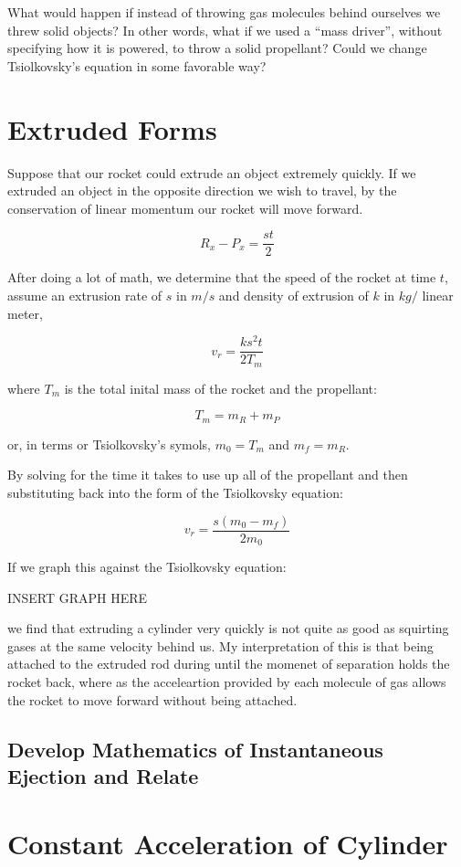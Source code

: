 \documentclass[11pt]{article}
\begin{document}
What would happen if instead of throwing gas molecules behind ourselves
we threw solid objects? In other words, what if we used a ``mass driver'',
without specifying how it is powered, to throw a solid propellant?
Could we change Tsiolkovsky's equation in some favorable way?

\section{Extruded Forms}

Suppose that our rocket could extrude an object extremely quickly.
If we extruded an object in the opposite direction we wish to travel,
by the conservation of linear momentum our rocket will move forward.

\[
\tag{Linear Extrusion} R_x - P_x  = \frac{s t}{2}
\]


After doing a lot of math, we determine that the speed of the rocket
at time $t$, assume an extrusion rate of $s$ in $m /s$ and density
of extrusion of $k$ in $kg / $ linear meter, 

\[
v_r = \frac{k s^2 t}{2 T_m}
\]

where $T_m$ is the total inital mass of the rocket and the propellant:

\[
T_m = m_R + m_P
\]

or, in terms or Tsiolkovsky's symols, $m_0 = T_m$ and $m_f = m_R$.

By solving for the time it takes to use up all of the propellant and
then substituting back into the form of the Tsiolkovsky equation:

\[
v_r = \frac{s (m_0-m_f)}{2 m_0}
\]

If we graph this against the Tsiolkovsky equation:

INSERT GRAPH HERE

we find that extruding a cylinder very quickly is not quite as
good as squirting gases at the same velocity behind us.
My interpretation of this is that being attached to the extruded
rod during until the momenet of separation holds the rocket back,
where as the acceleartion provided by each molecule of gas
allows the rocket to move forward without being attached.

\subsection{Develop Mathematics of Instantaneous Ejection and Relate}

\section{Constant Acceleration of Cylinder}
\end{document}
